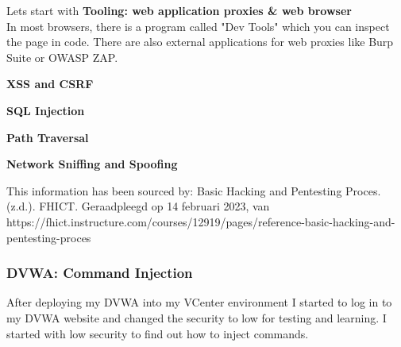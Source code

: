 \documentclass[12pt, letterpaper]{article}
\begin{document}
Lets start with \textbf{Tooling: web application proxies \& web browser}
\hfill\break
\\
In most browsers, there is a program called "Dev Tools" which you can inspect the page in code. There are also external applications for web proxies like Burp Suite or OWASP ZAP.
\hfill\break
\hfill\break

\textbf{XSS and CSRF}
\hfill\break
\hfill\break

\textbf{SQL Injection}
\hfill\break
\hfill\break


\textbf{Path Traversal}
\hfill\break



\textbf{Network Sniffing and Spoofing}
\hfill\break


This information has been sourced by: Basic Hacking and Pentesting Proces. (z.d.). FHICT. Geraadpleegd op 14 februari 2023, 
\hfill\break
van https://fhict.instructure.com/courses/12919/pages/reference-basic-hacking-and-pentesting-proces
\newpage
\subsubsection{DVWA: Command Injection}
After deploying my DVWA into my VCenter environment I started to log in to my DVWA website and changed the security to low for testing and learning. I started with low security to find out how to inject commands.
\hfill\break
\end{document}
